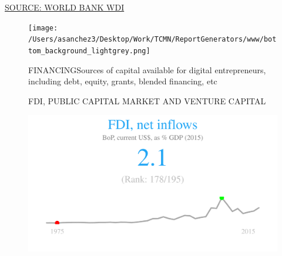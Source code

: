 \documentclass{article}\usepackage[]{graphicx}\usepackage[]{color}
\makeatletter
\def\maxwidth{ %
  \ifdim\Gin@nat@width>\linewidth
    \linewidth
  \else
    \Gin@nat@width
  \fi
}
\makeatother
\begin{document}
\begin{minipage}[b]{0.95\textwidth}
\begin{minipage}[c]{0.43\textwidth}
{}



    \vspace{-1ex} 
    \scriptsize{\href{NA}{\textcolor[HTML]{22A6F5}{SOURCE: WORLD BANK WDI}}}
  \end{minipage}
\end{minipage}  

\clearpage
\begin{figure}
  \vspace{108ex} %
  \texttt{[image: /Users/asanchez3/Desktop/Work/TCMN/ReportGenerators/www/bottom\_background\_lightgrey.png]}
\end{figure}

\begin{figure}
\vspace*{-27.5cm}
\hspace*{+1cm}
\begin{minipage}[c]{0.95\textwidth}
  \begin{minipage}[c]{0.95\textwidth}
    \begin{flushleft}  
     \Large{\textcolor[HTML]{22A6F5}{FINANCING}}\hspace{2ex}\small{\textcolor[HTML]{818181} {Sources of capital available for digital entrepreneurs, including debt, equity, grants, blended financing, etc}}
    \end{flushleft} 
     \small{\textcolor[HTML]{818181}{FDI, PUBLIC CAPITAL MARKET AND VENTURE CAPITAL}}
      \\[4pt]
      \begin{minipage}[c]{0.32\textwidth}  


{\centering \includegraphics[width=\maxwidth]{figure/figure_sparkline_Fin1-1} 

}
\end{minipage}
\end{minipage}
\end{minipage}
\end{figure}
\end{document}
